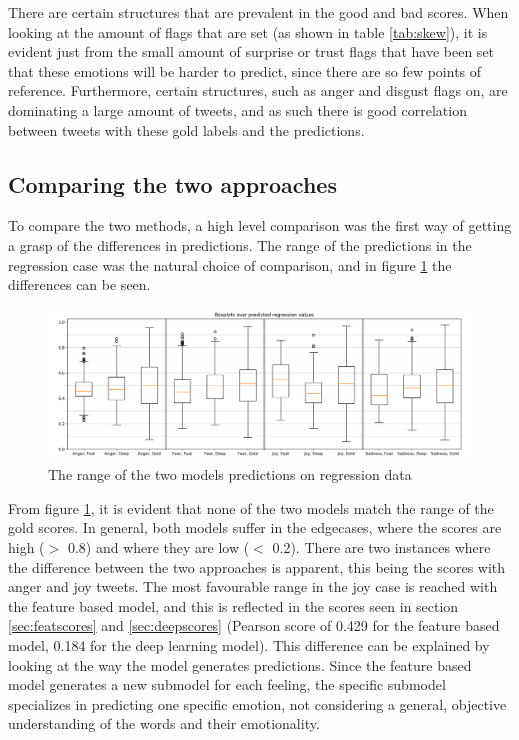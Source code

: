 There are certain structures that are prevalent in the good and bad scores. When looking at the amount of flags that are set (as shown in table \ref{tab:skew}), it is evident just from the small amount of surprise or trust flags that have been set that these emotions will be harder to predict, since there are so few points of reference. Furthermore, certain structures, such as anger and disgust flags on, are dominating a large amount of tweets, and as such there is good correlation between tweets with these gold labels and the predictions.


\subsection{Comparing the two approaches} \label{sec:comparison}
To compare the two methods, a high level comparison was the first way of getting a grasp of the differences in predictions. The range of the predictions in the regression case was the natural choice of comparison, and in figure \ref{fig:boxplot} the differences can be seen.
\begin{figure}[H]
    \centering
        \includegraphics[width=\textwidth]{pictures/boxplotmix.png}
        \caption{The range of the two models predictions on regression data}
        \label{fig:boxplot}
\end{figure}
From figure \ref{fig:boxplot}, it is evident that none of the two models match the range of the gold scores. In general, both models suffer in the edgecases, where the scores are high ($>$ 0.8) and where they are low ($<$ 0.2). There are two instances where the difference between the two approaches is apparent, this being the scores with anger and joy tweets. The most favourable range in the joy case is reached with the feature based model, and this is reflected in the scores seen in section \ref{sec:featscores} and \ref{sec:deepscores} (Pearson score of 0.429 for the feature based model, 0.184 for the deep learning model). This difference can be explained by looking at the way the model generates predictions. Since the feature based model generates a new submodel for each feeling, the specific  submodel specializes in predicting one specific emotion, not considering a general, objective understanding of the words and their emotionality.\\
